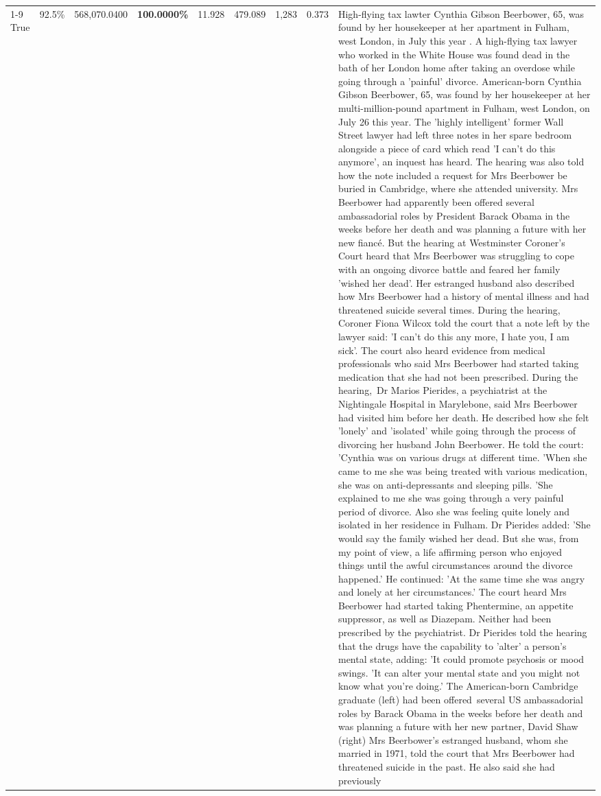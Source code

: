 \begin{table}[H]
\begin{tabular}{lllrlllll}
\cline{1-9}
True & 92.5\% & 568,070.0400 & \bfseries \color{red} 100.0000\% & 11.928 & 479.089 & 1,283 & 0.373 & High-flying tax lawter Cynthia Gibson Beerbower, 65, was found by her housekeeper at her apartment in Fulham, west London, in July this year . A high-flying tax lawyer who worked in the White House was found dead in the bath of her London home after taking an overdose while going through a 'painful' divorce. American-born Cynthia Gibson Beerbower, 65, was found by her housekeeper at her multi-million-pound apartment in Fulham, west London, on July 26 this year. The 'highly intelligent' former Wall Street lawyer had left three notes in her spare bedroom alongside a piece of card which read 'I can't do this anymore', an inquest has heard. The hearing was also told how the note included a request for Mrs Beerbower be buried in Cambridge, where she attended university. Mrs Beerbower had apparently been offered several ambassadorial roles by President Barack Obama in the weeks before her death and was planning a future with her new fiancé. But the hearing at Westminster Coroner's Court heard that Mrs Beerbower was struggling to cope with an ongoing divorce battle and feared her family 'wished her dead'. Her estranged husband also described how Mrs Beerbower had a history of mental illness and had threatened suicide several times. During the hearing, Coroner Fiona Wilcox told the court that a note left by the lawyer said: 'I can't do this any more, I hate you, I am sick'. The court also heard evidence from medical professionals who said Mrs Beerbower had started taking medication that she had not been prescribed. During the hearing, Dr Marios Pierides, a psychiatrist at the Nightingale Hospital in Marylebone, said Mrs Beerbower had visited him before her death. He described how she felt 'lonely' and 'isolated' while going through the process of divorcing her husband John Beerbower. He told the court: 'Cynthia was on various drugs at different time. 'When she came to me she was being treated with various medication, she was on anti-depressants and sleeping pills. 'She explained to me she was going through a very painful period of divorce. Also she was feeling quite lonely and isolated in her residence in Fulham. Dr Pierides added: 'She would say the family wished her dead. But she was, from my point of view, a life affirming person who enjoyed things until the awful circumstances around the divorce happened.' He continued: 'At the same time she was angry and lonely at her circumstances.' The court heard Mrs Beerbower had started taking Phentermine, an appetite suppressor, as well as Diazepam. Neither had been prescribed by the psychiatrist. Dr Pierides told the hearing that the drugs have the capability to 'alter' a person's mental state, adding: 'It could promote psychosis or mood swings. 'It can alter your mental state and you might not know what you're doing.' The American-born Cambridge graduate (left) had been offered several US ambassadorial roles by Barack Obama in the weeks before her death and was planning a future with her new partner, David Shaw (right) Mrs Beerbower's estranged husband, whom she married in 1971, told the court that Mrs Beerbower had threatened suicide in the past. He also said she had previously 
\end{tabular}
\end{table}
